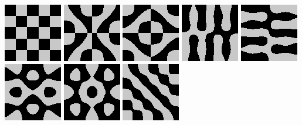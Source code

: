 \includegraphics{o/dchladni_033.png}
\includegraphics{o/dchladni_034.png}
\includegraphics{o/dchladni_035.png}
\includegraphics{o/dchladni_036.png}
\includegraphics{o/dchladni_037.png}
\includegraphics{o/dchladni_038.png}
\includegraphics{o/dchladni_039.png}
\includegraphics{o/dchladni_040.png}

